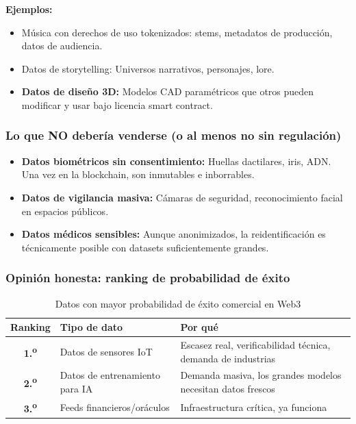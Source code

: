 \documentclass[12pt,a4paper]{article}
\newcommand{\goldmedal}{1.\textsuperscript{o}}
\newcommand{\silvermedal}{2.\textsuperscript{o}}
\newcommand{\bronzemedal}{3.\textsuperscript{o}}
\begin{document}
\textbf{Ejemplos:}
\begin{itemize}
    \item M\'{u}sica con derechos de uso tokenizados: stems, metadatos de producci\'{o}n, datos de audiencia.
    \item Datos de storytelling: Universos narrativos, personajes, lore.
    \item \textbf{Datos de dise\~{n}o 3D:} Modelos CAD param\'{e}tricos que otros pueden modificar y usar bajo licencia smart contract.
\end{itemize}

\subsubsection{Lo que NO deber\'{i}a venderse (o al menos no sin regulaci\'{o}n)}

\begin{itemize}
    \item \textbf{Datos biom\'{e}tricos sin consentimiento:} Huellas dactilares, iris, ADN. Una vez en la blockchain, son inmutables e inborrables.
    \item \textbf{Datos de vigilancia masiva:} C\'{a}maras de seguridad, reconocimiento facial en espacios p\'{u}blicos.
    \item \textbf{Datos m\'{e}dicos sensibles:} Aunque anonimizados, la reidentificaci\'{o}n es t\'{e}cnicamente posible con datasets suficientemente grandes.
\end{itemize}

\subsubsection{Opini\'{o}n honesta: ranking de probabilidad de \'{e}xito}

\begin{table}[h]
\centering
\begin{tabular}{|c|l|l|}
\hline
\textbf{Ranking} & \textbf{Tipo de dato} & \textbf{Por qu\'{e}} \\
\hline
\textbf{\goldmedal} & Datos de sensores IoT & Escasez real, verificabilidad t\'{e}cnica, demanda de industrias \\
\hline
\textbf{\silvermedal} & Datos de entrenamiento para IA & Demanda masiva, los grandes modelos necesitan datos frescos \\
\hline
\textbf{\bronzemedal} & Feeds financieros/or\'{a}culos & Infraestructura cr\'{i}tica, ya funciona \\
\hline
\end{tabular}
\caption{Datos con mayor probabilidad de \'{e}xito comercial en Web3}
\end{table}
\end{document}
